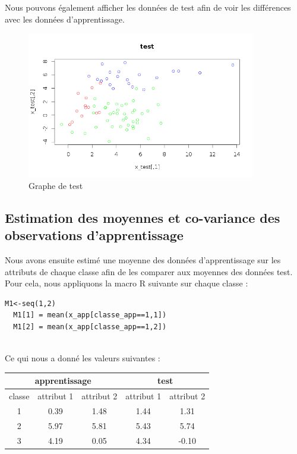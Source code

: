 \documentclass[a4paper,11pt]{article}
\begin{document}
  Nous pouvons également afficher les données de test afin de voir les
  différences avec les données d'apprentissage.
  \newpage
  \begin{figure}[H]
   \centering
   \includegraphics[width=10cm]{ensemble_test.png}
   \caption{Graphe de test}
  \end{figure}
   
  \subsection{Estimation des moyennes et co-variance des observations d'apprentissage}
  Nous avons ensuite estimé une moyenne des données d'apprentissage
  sur les attributs de chaque classe afin de les comparer aux moyennes
  des données test. Pour cela, nous appliquons la macro R suivante sur
  chaque classe :
  
  \begin{lstlisting}[caption=Estimation de la moyenne pour la classe d'apprentissage 1]
  M1<-seq(1,2)
  M1[1] = mean(x_app[classe_app==1,1])
  M1[2] = mean(x_app[classe_app==1,2])
  \end{lstlisting}
  \ \\
  Ce qui nous a donné les valeurs suivantes :\\
  
  \begin{center}
    \begin{tabular}{|c|c|c|c|c|}
    \hline
    \multicolumn{3}{|c|}{apprentissage} & \multicolumn{2}{c|}{test}\\
    \hline
    classe & attribut 1 & attribut 2 & attribut 1 & attribut 2\\
    \hline
    1 & 0.39 & 1.48 & 1.44 & 1.31\\
    \hline
    2 & 5.97 & 5.81 & 5.43 & 5.74\\
    \hline
    3 & 4.19 & 0.05 & 4.34 & -0.10\\
    \hline
    \end{tabular}
  \end{center}
  
\end{document}

